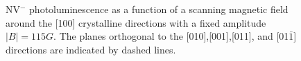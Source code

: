 \documentclass[9pt,twocolumn,twoside]{osajnl}
\begin{document}
\begin{figure}[ht]
\centering
{}
\caption{NV$^-$ photoluminescence as a function of a scanning magnetic field around the [100] crystalline directions with a fixed amplitude $|B|=115G$. The planes orthogonal to the [010],[001],[011], and [01$\bar 1$] directions are indicated by dashed lines.}
\label{map}
\end{figure}
 
\end{document}
